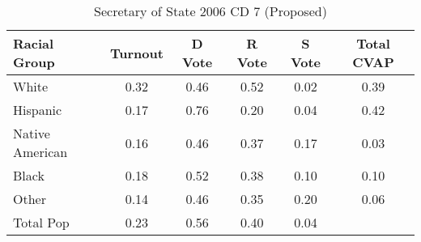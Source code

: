 \begin{table}[htb]
\begin{center}
\caption{Secretary of State 2006 CD 7 (Proposed)}
\label{sos06_cvap_cd_7}
\begin{tabular}{lccccc}
  \hline
Racial Group & Turnout & D Vote & R Vote & S Vote & Total CVAP \\ 
  \hline
White & 0.32 & 0.46 & 0.52 & 0.02 & 0.39 \\ 
  Hispanic & 0.17 & 0.76 & 0.20 & 0.04 & 0.42 \\ 
  Native American & 0.16 & 0.46 & 0.37 & 0.17 & 0.03 \\ 
  Black & 0.18 & 0.52 & 0.38 & 0.10 & 0.10 \\ 
  Other & 0.14 & 0.46 & 0.35 & 0.20 & 0.06 \\ 
  Total Pop & 0.23 & 0.56 & 0.40 & 0.04 &  \\ 
   \hline
\end{tabular}
\end{center}
\end{table}
